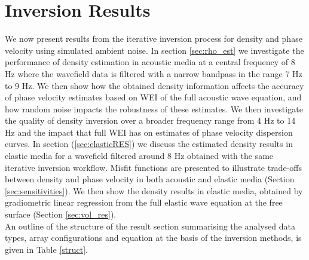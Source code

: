 \documentclass{article}
\begin{document}
	\section{Inversion Results}
	We now present results from the iterative inversion process for density and phase velocity using simulated ambient noise. In section \ref{sec:rho_est} we investigate the performance of density estimation in acoustic media at a central frequency of 8 Hz where the wavefield data is filtered with a narrow bandpass in the range 7 Hz to 9 Hz. We then show how the obtained density information affects the accuracy of phase velocity estimates based on WEI of the full acoustic wave equation, and how random noise impacts the robustness of these estimates. We then investigate the quality of density inversion over a broader frequency range from 4 Hz to 14 Hz and the impact that full WEI has on estimates of phase velocity dispersion curves. In section (\ref{sec:elasticRES}) we discuss the estimated density results in elastic media for a wavefield filtered around 8 Hz obtained with the same iterative inversion workflow. Misfit functions are presented to illustrate trade-offs between density and phase velocity in both acoustic and elastic media (Section \ref{sec:sensitivities}). We then show the density results in elastic media, obtained by gradiometric linear regression from the full elastic wave equation at the free surface (Section \ref{sec:vol_res}).\\
	
	An outline of the structure of the result section summarising the analysed data types, array configurations and equation at the basis of the inversion methods, is given in Table \ref{struct}.
	
\end{document}

